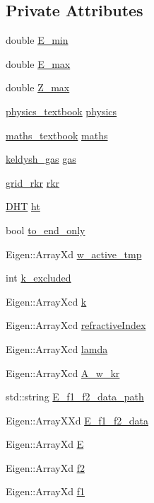 \subsection*{Private Attributes}
\begin{DoxyCompactItemize}
\item 
double \hyperlink{classpropagation_ab5a753d760a135806a93b9082e8019fb}{E\+\_\+min}
\item 
double \hyperlink{classpropagation_a5d2b4202c82db47a1276c0ef1f7ad8c8}{E\+\_\+max}
\item 
double \hyperlink{classpropagation_ae0b2d1a8fa0e59d37e124a0ba1f12dd2}{Z\+\_\+max}
\item 
\hyperlink{classphysics__textbook}{physics\+\_\+textbook} \hyperlink{classpropagation_a42a6e725e3dd53cf94192bf93c31c8de}{physics}
\item 
\hyperlink{classmaths__textbook}{maths\+\_\+textbook} \hyperlink{classpropagation_ab5a5024c2d06c0dad06c745af7c6416c}{maths}
\item 
\hyperlink{classkeldysh__gas}{keldysh\+\_\+gas} \hyperlink{classpropagation_a4152dc9a226a7ff91aff2338d0bd813f}{gas}
\item 
\hyperlink{classgrid__rkr}{grid\+\_\+rkr} \hyperlink{classpropagation_a3d37531bb5918f972544d242aec7e72b}{rkr}
\item 
\hyperlink{class_d_h_t}{D\+HT} \hyperlink{classpropagation_a044544975e7fc2ec3df9a55d92f8cc90}{ht}
\item 
bool \hyperlink{classpropagation_a939b7a85171b3e5ce06560a3885ef0ca}{to\+\_\+end\+\_\+only}
\item 
Eigen\+::\+Array\+Xd \hyperlink{classpropagation_a07a80b67a345e3e9d8e934d2265ba288}{w\+\_\+active\+\_\+tmp}
\item 
int \hyperlink{classpropagation_a76f3651eac23a69c1259dc0406fbe0d9}{k\+\_\+excluded}
\item 
Eigen\+::\+Array\+Xcd \hyperlink{classpropagation_a49a30e941421cd5e3f0b62bd1335a767}{k}
\item 
Eigen\+::\+Array\+Xcd \hyperlink{classpropagation_aba601a0df3c63b13215c55d8ade2bcd7}{refractive\+Index}
\item 
Eigen\+::\+Array\+Xcd \hyperlink{classpropagation_a5ae0154dc8db04188ba92e10ba981000}{lamda}
\item 
Eigen\+::\+Array\+Xcd \hyperlink{classpropagation_a4df23dd19a8cca8a4cb032718dc2b258}{A\+\_\+w\+\_\+kr}
\item 
std\+::string \hyperlink{classpropagation_abd78bf6976f2b2d0a3fc82b9cf0d9dc6}{E\+\_\+f1\+\_\+f2\+\_\+data\+\_\+path}
\item 
Eigen\+::\+Array\+X\+Xd \hyperlink{classpropagation_a53ab4838e0e66b55c2ab1398389a22f5}{E\+\_\+f1\+\_\+f2\+\_\+data}
\item 
Eigen\+::\+Array\+Xd \hyperlink{classpropagation_aff3713e9170542e31c952a2d1b760eec}{E}
\item 
Eigen\+::\+Array\+Xd \hyperlink{classpropagation_a747dcaf8f7405a17af992bae39b7fab5}{f2}
\item 
Eigen\+::\+Array\+Xd \hyperlink{classpropagation_a14d6e72396c1c354c6d9986f2d79f85f}{f1}
\end{DoxyCompactItemize}


